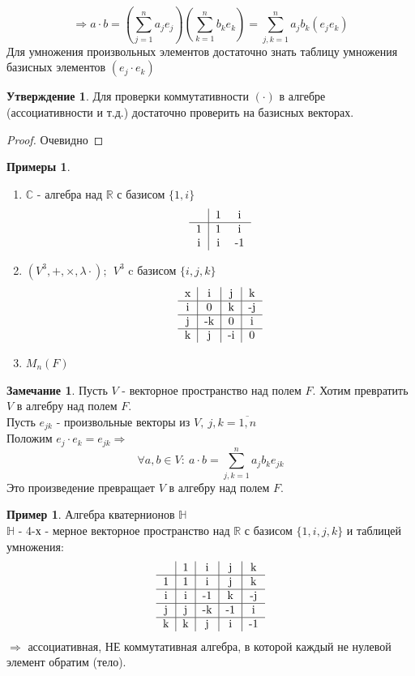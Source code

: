 \documentclass[a4paper, 12pt]{article}
\newcommand{\R}{\mathbb R}
\newcommand\tab[1][.5cm]{\hspace*{#1}}
\theoremstyle{definition}
\newtheorem*{subtheorem}{Утверждение}
\newtheorem*{remark}{Замечание}
\newtheorem*{example}{Примеры}
\newtheorem*{example1}{Пример}
\begin{document}
  $$\Longrightarrow a \cdot b = (\sum \limits_{j=1}^na_je_j)(\sum \limits_{k=1}^nb_ke_k) = \sum \limits_{j,k=1}^na_jb_k(e_je_k)$$ 
  Для умножения произвольных элементов достаточно знать таблицу умножения базисных элементов $(e_j \cdot e_k)$ 
  \begin{subtheorem}
    Для проверки коммутативности $(\cdot)$ в алгебре (ассоциативности и т.д.) достаточно проверить на базисных векторах. 
  \end{subtheorem} 
  \begin{proof}
    Очевидно
  \end{proof}
  \begin{example}\tab
    \begin{enumerate}
      \item $\mathbb{C}$ - алгебра над $\R$ с базисом $\{1, i\}$
      $$\begin{tabular}{c|cc}
        \null & 1 & i \\ \hline
        1 & 1 & i \\
        i & i & -1
      \end{tabular}$$
      \item $(V^3, +, \times, \lambda \cdot); \  \ V^3$ c базисом $\{i, j, k\}$
      $$\begin{tabular}{c|c|c|c}
        x & i & j & k \\ \hline
        i & 0 & k & -j \\ \hline
        j & -k & 0 & i \\ \hline
        k & j & -i & 0
      \end{tabular}$$
      \item $M_n(F)$
    \end{enumerate}
  \end{example}
  \begin{remark}
    Пусть $V$ - векторное пространство над полем $F$.
  Хотим превратить $V$ в алгебру над полем $F$. \\
  Пусть $e_{jk}$ - произвольные векторы из $V, \ j,k = \overline{1, n}$ \\
  Положим $e_j \cdot e_k = e_{jk} \Longrightarrow $ $$\forall a, b\in V: \ a\cdot b=\sum \limits_{j,k=1}^na_jb_ke_{jk}$$
  Это произведение превращает $V$ в алгебру над полем $F$.  
  \end{remark} 
  \begin{example1}
    Алгебра кватернионов $\mathbb{H}$ \\
    $\mathbb{H}$ - 4-х - мерное векторное пространство над $\R$ с базисом $\{1, i, j, k\}$ и таблицей умножения:
    $$\begin{tabular}{c|c|c|c|c}
        \null & 1 & i & j & k \\ \hline
        1 & 1 & i & j & k \\ \hline
        i & i & -1 & k & -j \\ \hline
        j & j & -k & -1 & i \\ \hline
        k & k & j & i & -1
      \end{tabular}$$
      $\Longrightarrow $ ассоциативная, НЕ коммутативная алгебра, в которой каждый не нулевой элемент обратим (тело).  
  \end{example1}
\end{document}
